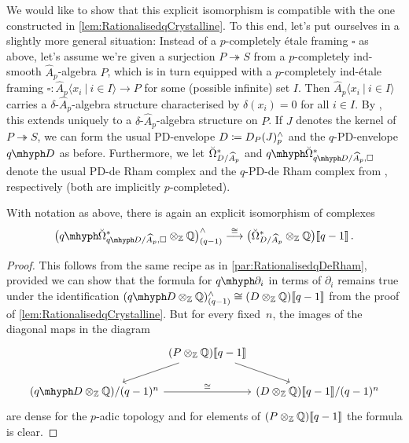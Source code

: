 \documentclass[DIV=12,numbers=enddot,leqno,bibliography=totoc]{scrartcl}
\begin{document}
\begin{numpar}
		We would like to show that this explicit isomorphism is compatible with the one constructed in \cref{lem:RationalisedqCrystalline}. To this end, let's put ourselves in a slightly more general situation: Instead of a $p$-completely étale framing $\square$ as above, let's assume we're given a surjection $P\twoheadrightarrow S$ from a $p$-completely ind-smooth $\widehat{A}_p$-algebra $P$, which is in turn equipped with a $p$-completely ind-étale framing $\square\colon \widehat{A}_p\langle x_i\ |\ i\in I\rangle\rightarrow P$ for some (possible infinite) set $I$. Then $\widehat{A}_p\langle x_i\ |\ i\in I\rangle$ carries a $\delta$-$\widehat{A}_p$-algebra structure characterised by $\delta(x_i)=0$ for all $i\in I$. By \cite[Lemma~]{Prismatic}, this extends uniquely to a $\delta$-$\widehat{A}_p$-algebra structure on $P$. If $J$ denotes the kernel of $P\twoheadrightarrow S$, we can form the usual PD-envelope $D\coloneqq D_P(J)_p^\complete$ and the $q$-PD-envelope $\q D$ as before. Furthermore, we let $\breve{\Omega}_{D/\smash{\widehat{A}}_p}^*$ and $\q\breve{\Omega}_{\q D/\smash{\widehat{A}}_p, \square}^*$ denote the usual PD-de Rham complex and the $q$-PD-de Rham complex from \cite[Construction~]{Prismatic}, respectively (both are implicitly $p$-completed).
	\end{numpar}
	\begin{lem}\label{lem:RationalisedqDeRham}
		With notation as above, there is again an explicit isomorphism of complexes
		\begin{equation*}
			\bigl(\q\breve{\Omega}_{\q D/\smash{\widehat{A}}_p, \square}^*\otimes_{\IZ}\IQ\bigr)_{(q-1)}^\complete\overset{\cong}{\longrightarrow} \bigl(\breve{\Omega}_{D/\smash{\widehat{A}}_p}^*\otimes_{\IZ}\IQ\bigr)\qpower\,.
		\end{equation*}
	\end{lem}
	\begin{proof}
		This follows from the same recipe as in \cref{par:RationalisedqDeRham}, provided we can show that the formula for $\q\partial_i$ in terms of $\partial_i$ remains true under the identification $(\q D\otimes_{\IZ}\IQ)_{(q-1)}^\complete\cong (D\otimes_{\IZ}\IQ)\qpower$ from the proof of \cref{lem:RationalisedqCrystalline}. But for every fixed~$n$, the images of the diagonal maps in the diagram
		\begin{equation*}
			\begin{tikzcd}[column sep=0pt]
				& \left(P\otimes_{\IZ}\IQ\right)\qpower\dlar\drar & \\
				\left(\q D\otimes_{\IZ}\IQ\right)/(q-1)^n\ar[rr,"\cong"] & & \left(D\otimes_{\IZ}\IQ\right)\qpower/(q-1)^n
			\end{tikzcd}
		\end{equation*}
		are dense for the $p$-adic topology and for elements of $(P\otimes_{\mathbb{Z}} \mathbb{Q})\llbracket q-1\rrbracket$ the formula is clear.
	\end{proof}
\end{document}
